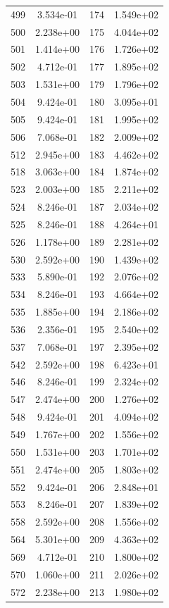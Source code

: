 \documentclass[12pt]{article}
\begin{document}
\begin{longtable}{@{}cccc@{}}
499 & 3.534e-01 & 174 & 1.549e+02 \\
500 & 2.238e+00 & 175 & 4.044e+02 \\
501 & 1.414e+00 & 176 & 1.726e+02 \\
502 & 4.712e-01 & 177 & 1.895e+02 \\
503 & 1.531e+00 & 179 & 1.796e+02 \\
504 & 9.424e-01 & 180 & 3.095e+01 \\
505 & 9.424e-01 & 181 & 1.995e+02 \\
506 & 7.068e-01 & 182 & 2.009e+02 \\
512 & 2.945e+00 & 183 & 4.462e+02 \\
518 & 3.063e+00 & 184 & 1.874e+02 \\
523 & 2.003e+00 & 185 & 2.211e+02 \\
524 & 8.246e-01 & 187 & 2.034e+02 \\
525 & 8.246e-01 & 188 & 4.264e+01 \\
526 & 1.178e+00 & 189 & 2.281e+02 \\
530 & 2.592e+00 & 190 & 1.439e+02 \\
533 & 5.890e-01 & 192 & 2.076e+02 \\
534 & 8.246e-01 & 193 & 4.664e+02 \\
535 & 1.885e+00 & 194 & 2.186e+02 \\
536 & 2.356e-01 & 195 & 2.540e+02 \\
537 & 7.068e-01 & 197 & 2.395e+02 \\
542 & 2.592e+00 & 198 & 6.423e+01 \\
546 & 8.246e-01 & 199 & 2.324e+02 \\
547 & 2.474e+00 & 200 & 1.276e+02 \\
548 & 9.424e-01 & 201 & 4.094e+02 \\
549 & 1.767e+00 & 202 & 1.556e+02 \\
550 & 1.531e+00 & 203 & 1.701e+02 \\
551 & 2.474e+00 & 205 & 1.803e+02 \\
552 & 9.424e-01 & 206 & 2.848e+01 \\
553 & 8.246e-01 & 207 & 1.839e+02 \\
558 & 2.592e+00 & 208 & 1.556e+02 \\
564 & 5.301e+00 & 209 & 4.363e+02 \\
569 & 4.712e-01 & 210 & 1.800e+02 \\
570 & 1.060e+00 & 211 & 2.026e+02 \\
572 & 2.238e+00 & 213 & 1.980e+02 \\

\end{longtable}
\end{document}
